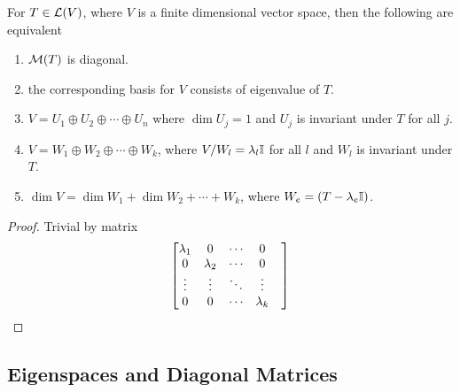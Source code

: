 \begin{theorem}
    For $T \in \mathcal L(V)$, where $V$ is a finite dimensional vector space, then the following are equivalent
    \begin{enumerate}
        \item $\mathcal M(T)$ is diagonal.
        \item the corresponding basis for $V$ consists of eigenvalue of $T$.
        \item $V = U_1 \oplus U_2 \oplus \cdots \oplus U_n$ where $\dim U_j = 1$ and $U_j$ is invariant under $T$ for all $j$.
        \item $V = W_1 \oplus W_2 \oplus \cdots \oplus W_k$, where $V/W_l = \lambda_l \mathbb I$ for all $l$ and $W_l$ is invariant under $T$.
        \item $\dim V = \dim W_1 + \dim W_2 + \cdots + W_k$, where $W_e = \null (T - \lambda_e \b I)$.
    \end{enumerate}
\end{theorem}

\begin{proof}
Trivial by matrix
    \[ \begin{bmatrix} \lambda_1 & 0 & \cdots & 0 & \\
0 & \lambda_2 & \cdots & 0 & \\
\vdots & \vdots & \ddots & \vdots & \\
0 & 0 & \cdots & \lambda_k & \\ \end{bmatrix}\]
\end{proof}



\subsection{Eigenspaces and Diagonal Matrices}










